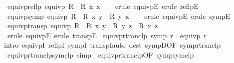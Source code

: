 \begin{isabellebody}
\isanewline
{}\isamarkupfalse%
\ equivp{\isacharunderscore}{\kern0pt}reflp{\isacharcolon}{\kern0pt}\ {\isachardoublequoteopen}equivp\ R\ {\isasymLongrightarrow}\ R\ x\ x{\isachardoublequoteclose}\isanewline
%
\isadelimproof
\ \ %
\endisadelimproof
%
\isatagproof
{}\isamarkupfalse%
\ {\isacharparenleft}{\kern0pt}erule\ equivpE{\isacharcomma}{\kern0pt}\ erule\ reflpE{\isacharparenright}{\kern0pt}%
\endisatagproof
{\isafoldproof}%
%
\isadelimproof
\isanewline
%
\endisadelimproof
\isanewline
{}\isamarkupfalse%
\ equivp{\isacharunderscore}{\kern0pt}symp{\isacharcolon}{\kern0pt}\ {\isachardoublequoteopen}equivp\ R\ {\isasymLongrightarrow}\ R\ x\ y\ {\isasymLongrightarrow}\ R\ y\ x{\isachardoublequoteclose}\isanewline
%
\isadelimproof
\ \ %
\endisadelimproof
%
\isatagproof
{}\isamarkupfalse%
\ {\isacharparenleft}{\kern0pt}erule\ equivpE{\isacharcomma}{\kern0pt}\ erule\ sympE{\isacharparenright}{\kern0pt}%
\endisatagproof
{\isafoldproof}%
%
\isadelimproof
\isanewline
%
\endisadelimproof
\isanewline
{}\isamarkupfalse%
\ equivp{\isacharunderscore}{\kern0pt}transp{\isacharcolon}{\kern0pt}\ {\isachardoublequoteopen}equivp\ R\ {\isasymLongrightarrow}\ R\ x\ y\ {\isasymLongrightarrow}\ R\ y\ z\ {\isasymLongrightarrow}\ R\ x\ z{\isachardoublequoteclose}\isanewline
%
\isadelimproof
\ \ %
\endisadelimproof
%
\isatagproof
{}\isamarkupfalse%
\ {\isacharparenleft}{\kern0pt}erule\ equivpE{\isacharcomma}{\kern0pt}\ erule\ transpE{\isacharparenright}{\kern0pt}%
\endisatagproof
{\isafoldproof}%
%
\isadelimproof
\isanewline
%
\endisadelimproof
\isanewline
{}\isamarkupfalse%
\ equivp{\isacharunderscore}{\kern0pt}rtranclp{\isacharcolon}{\kern0pt}\ {\isachardoublequoteopen}symp\ r\ {\isasymLongrightarrow}\ equivp\ r\isactrlsup {\isacharasterisk}{\kern0pt}\isactrlsup {\isacharasterisk}{\kern0pt}{\isachardoublequoteclose}\isanewline
%
\isadelimproof
\ \ %
\endisadelimproof
%
\isatagproof
{}\isamarkupfalse%
{\isacharparenleft}{\kern0pt}intro\ equivpI\ reflpI\ sympI\ transpI{\isacharparenright}{\kern0pt}{\isacharparenleft}{\kern0pt}auto\ dest{\isacharcolon}{\kern0pt}\ sympD{\isacharbrackleft}{\kern0pt}OF\ symp{\isacharunderscore}{\kern0pt}rtranclp{\isacharbrackright}{\kern0pt}{\isacharparenright}{\kern0pt}%
\endisatagproof
{\isafoldproof}%
%
\isadelimproof
\isanewline
%
\endisadelimproof
\isanewline
{}\isamarkupfalse%
\ equivp{\isacharunderscore}{\kern0pt}rtranclp{\isacharunderscore}{\kern0pt}symclp\ {\isacharbrackleft}{\kern0pt}simp{\isacharbrackright}{\kern0pt}\ {\isacharequal}{\kern0pt}\ equivp{\isacharunderscore}{\kern0pt}rtranclp{\isacharbrackleft}{\kern0pt}OF\ symp{\isacharunderscore}{\kern0pt}symclp{\isacharbrackright}{\kern0pt}\isanewline

\end{isabellebody}
